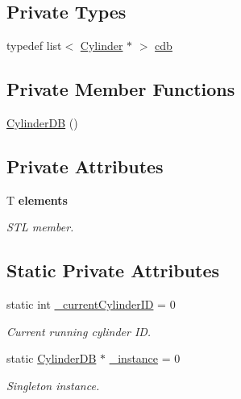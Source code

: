\subsection*{Private Types}
\begin{DoxyCompactItemize}
\item 
typedef list$<$ \hyperlink{classCylinder}{Cylinder} $\ast$ $>$ \hyperlink{classCylinderDB_af50249b0e7e84696b9c0933369813172}{cdb}
\end{DoxyCompactItemize}
\subsection*{Private Member Functions}
\begin{DoxyCompactItemize}
\item 
\hyperlink{classCylinderDB_a969248adb7f59fe814c0bc47bd90e592}{Cylinder\+D\+B} ()
\end{DoxyCompactItemize}
\subsection*{Private Attributes}
\begin{DoxyCompactItemize}
\item 
T {\bfseries elements}
\begin{DoxyCompactList}\small\item\em S\+T\+L member. \end{DoxyCompactList}\end{DoxyCompactItemize}
\subsection*{Static Private Attributes}
\begin{DoxyCompactItemize}
\item 
static int \hyperlink{classCylinderDB_a843563c646f732d1ab1c1f6986a5afc1}{\+\_\+current\+Cylinder\+I\+D} = 0
\begin{DoxyCompactList}\small\item\em Current running cylinder I\+D. \end{DoxyCompactList}\item 
static \hyperlink{classCylinderDB}{Cylinder\+D\+B} $\ast$ \hyperlink{classCylinderDB_aa0aa894f65e725911dfc9bcbf4bf4f0a}{\+\_\+instance} = 0
\begin{DoxyCompactList}\small\item\em Singleton instance. \end{DoxyCompactList}\end{DoxyCompactItemize}


